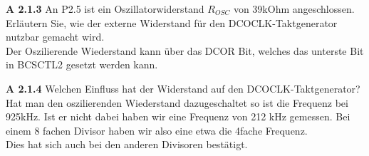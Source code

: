 \begin{description}
\item{\bfseries A 2.1.3} An P2.5 ist ein Oszillatorwiderstand $R_{OSC}$ von 39kOhm angeschlossen. Erläutern Sie, wie der externe Widerstand für den DCOCLK-Taktgenerator nutzbar gemacht wird.\\

Der Oszilierende Wiederstand kann über das DCOR Bit, welches das unterste Bit in BCSCTL2 gesetzt werden kann.

\item{\bfseries A 2.1.4} Welchen Einfluss hat der Widerstand auf den DCOCLK-Taktgenerator? \\

Hat man den oszilierenden Wiederstand dazugeschaltet so ist die Frequenz bei 925kHz. Ist er nicht dabei haben wir eine Frequenz von 212 kHz gemessen. Bei einem 8 fachen Divisor haben wir also eine etwa die 4fache Frequenz.\\
Dies hat sich auch bei den anderen Divisoren bestätigt.

\end{description}